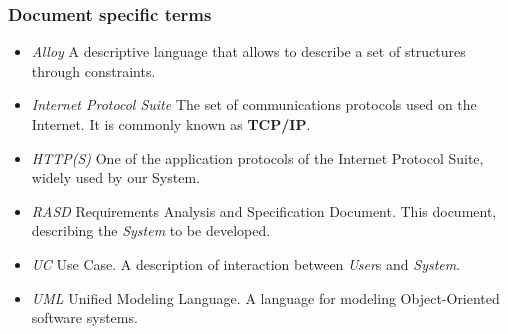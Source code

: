 \subsubsection{Document specific terms}
\begin{itemize}
	\item \emph{Alloy} 
	A descriptive language that allows to describe a set of structures through constraints.
	
	\item \emph{Internet Protocol Suite}
	The set of communications protocols used on the Internet. It is commonly known as \textbf{TCP/IP}.
	
	\item \emph{HTTP(S)}
	One of the application protocols of the Internet Protocol Suite, widely used by our System.
	
	\item \emph{RASD}
	Requirements Analysis and Specification Document. This document, describing the \emph{System} to be developed.
	
	\item \emph{UC}
	Use Case. A description of interaction between \emph{User}s and \emph{System}.
	
	\item \emph{UML}
	Unified Modeling Language. A language for modeling Object-Oriented software systems.
\end{itemize}